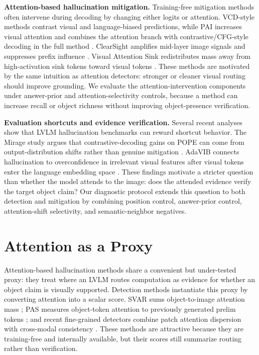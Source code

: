 \documentclass[letterpaper]{article} \usepackage[submission]{aaai2027}  \usepackage[hyphens]{url}  \usepackage{graphicx} \urlstyle{rm} \def\UrlFont{\rm}  \usepackage{natbib}  \usepackage{caption} \frenchspacing
\begin{document}
\noindent\textbf{Attention-based hallucination mitigation.}
Training-free mitigation methods often intervene during decoding by changing either logits or attention. VCD-style methods contrast visual and language-biased predictions, while PAI increases visual attention and combines the attention branch with contrastive/CFG-style decoding in the full method \cite{liu2024pai}. ClearSight amplifies mid-layer image signals and suppresses prefix influence \cite{yin2025clearsight}. Visual Attention Sink redistributes mass away from high-activation sink tokens toward visual tokens \cite{kang2025visualsink}. These methods are motivated by the same intuition as attention detectors: stronger or cleaner visual routing should improve grounding. We evaluate the attention-intervention components under answer-prior and attention-selectivity controls, because a method can increase recall or object richness without improving object-presence verification.

\noindent\textbf{Evaluation shortcuts and evidence verification.}
Several recent analyses show that LVLM hallucination benchmarks can reward shortcut behavior. The Mirage study argues that contrastive-decoding gains on POPE can come from output-distribution shifts rather than genuine mitigation \cite{yin2025mirage}. AdaVIB connects hallucination to overconfidence in irrelevant visual features after visual tokens enter the language embedding space \cite{bai2025adavib}. These findings motivate a stricter question than whether the model attends to the image: does the attended evidence verify the target object claim? Our diagnostic protocol extends this question to both detection and mitigation by combining position control, answer-prior control, attention-shift selectivity, and semantic-neighbor negatives.
 \section{Attention as a Proxy}
\label{sec:proxy}

Attention-based hallucination methods share a convenient but under-tested proxy: they treat where an LVLM routes computation as evidence for whether an object claim is visually supported. Detection methods instantiate this proxy by converting attention into a scalar score. SVAR sums object-to-image attention mass \cite{jiang2024devils}; PAS measures object-token attention to previously generated prelim tokens \cite{hoangxuan2026pas}; and recent fine-grained detectors combine patch attention dispersion with cross-modal consistency \cite{beyond2026global}. These methods are attractive because they are training-free and internally available, but their scores still summarize routing rather than verification.
\end{document}
